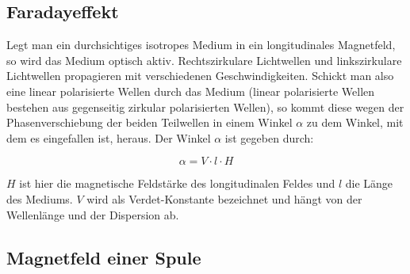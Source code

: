 \subsection{Faradayeffekt}

Legt man ein durchsichtiges isotropes Medium in ein longitudinales Magnetfeld, so wird das Medium optisch aktiv. Rechtszirkulare Lichtwellen und linkszirkulare Lichtwellen propagieren mit verschiedenen Geschwindigkeiten. Schickt man also eine linear polarisierte Wellen durch das Medium (linear polarisierte Wellen bestehen aus gegenseitig zirkular polarisierten Wellen), so kommt diese wegen der Phasenverschiebung der beiden Teilwellen in einem Winkel $\alpha$ zu dem Winkel, mit dem es eingefallen ist, heraus. Der Winkel $\alpha$ ist gegeben durch:

\begin{equation} \alpha = V\cdot l \cdot H \end{equation}

$H$ ist hier die magnetische Feldstärke des longitudinalen Feldes und $l$ die Länge des Mediums. $V$ wird als Verdet-Konstante bezeichnet und hängt von der Wellenlänge und der Dispersion ab.

\subsection{Magnetfeld einer Spule}





























\clearpage